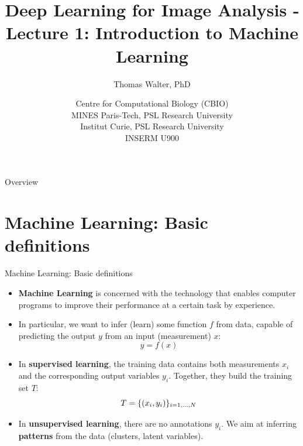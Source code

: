 \documentclass[xcolor=pdftex,dvipsnames,table]{beamer}
\title{Deep Learning for Image Analysis - \\
	   Lecture 1: Introduction to Machine Learning}
\author{Thomas Walter, PhD}
\date{Centre for Computational Biology (CBIO) \\
	  MINES Paris-Tech, PSL Research University \\
	  Institut Curie, PSL Research University \\
	  INSERM U900}
\begin{document}
\begin{frame}
\titlepage
\end{frame}

\begin{frame}{Overview}
\tableofcontents
\end{frame}

\section{Machine Learning: Basic definitions}

\begin{frame}{Machine Learning: Basic definitions}
\begin{itemize}
    \item \textbf{Machine Learning} is concerned with the technology that enables computer programs to improve their performance at a certain task by experience.
	\item In particular, we want to infer (learn) some function $f$ from data, capable of predicting the output $y$ from an input (measurement) $x$:
	\begin{equation*}
	y = f(x)
	\end{equation*}
      	\item In \textbf{supervised learning}, the training data contains both measurements $x_i$ and the corresponding output variables $y_i$. Together, they build the training set $T$:
	\begin{equation*}
	T = \{(x_i, y_i)\}_{i=1, \ldots, N}
	\end{equation*}
	\item In \textbf{unsupervised learning}, there are no annotations $y_i$. We aim at inferring \textbf{patterns} from the data (clusters, latent variables).
\end{itemize}
\end{frame}
\end{document}
